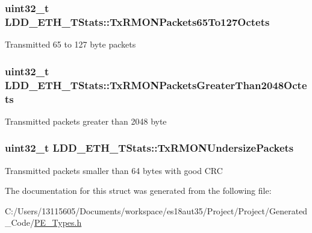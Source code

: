\subsubsection[{Tx\+R\+M\+O\+N\+Packets65\+To127\+Octets}]{\setlength{\rightskip}{0pt plus 5cm}uint32\+\_\+t L\+D\+D\+\_\+\+E\+T\+H\+\_\+\+T\+Stats\+::\+Tx\+R\+M\+O\+N\+Packets65\+To127\+Octets}\label{struct_l_d_d___e_t_h___t_stats_afd6d14f52f7a9646e7a202abd30b4aea}
Transmitted 65 to 127 byte packets \hypertarget{struct_l_d_d___e_t_h___t_stats_a8f892961bd1e66bf6c75e6acec8d8816}{}
\subsubsection[{Tx\+R\+M\+O\+N\+Packets\+Greater\+Than2048\+Octets}]{\setlength{\rightskip}{0pt plus 5cm}uint32\+\_\+t L\+D\+D\+\_\+\+E\+T\+H\+\_\+\+T\+Stats\+::\+Tx\+R\+M\+O\+N\+Packets\+Greater\+Than2048\+Octets}\label{struct_l_d_d___e_t_h___t_stats_a8f892961bd1e66bf6c75e6acec8d8816}
Transmitted packets greater than 2048 byte \hypertarget{struct_l_d_d___e_t_h___t_stats_a71c3b9e66b78d20604a952804089a347}{}
\subsubsection[{Tx\+R\+M\+O\+N\+Undersize\+Packets}]{\setlength{\rightskip}{0pt plus 5cm}uint32\+\_\+t L\+D\+D\+\_\+\+E\+T\+H\+\_\+\+T\+Stats\+::\+Tx\+R\+M\+O\+N\+Undersize\+Packets}\label{struct_l_d_d___e_t_h___t_stats_a71c3b9e66b78d20604a952804089a347}
Transmitted packets smaller than 64 bytes with good C\+R\+C 

The documentation for this struct was generated from the following file\+:\begin{DoxyCompactItemize}
\item 
C\+:/\+Users/13115605/\+Documents/workspace/es18aut35/\+Project/\+Project/\+Generated\+\_\+\+Code/\hyperlink{_p_e___types_8h}{P\+E\+\_\+\+Types.\+h}\end{DoxyCompactItemize}
